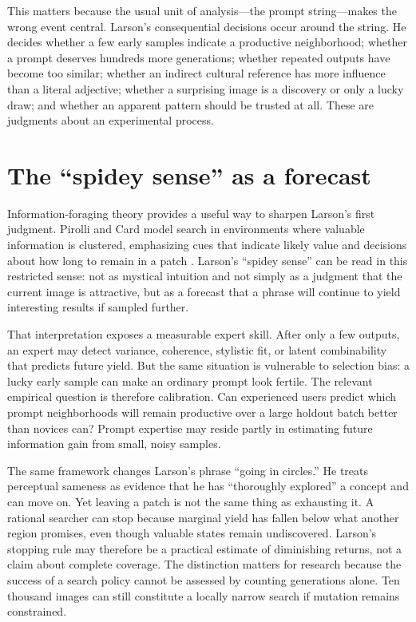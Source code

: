 \documentclass[11pt]{article}
\begin{document}
This matters because the usual unit of analysis—the prompt string—makes the wrong event central. Larson’s consequential decisions occur around the string. He decides whether a few early samples indicate a productive neighborhood; whether a prompt deserves hundreds more generations; whether repeated outputs have become too similar; whether an indirect cultural reference has more influence than a literal adjective; whether a surprising image is a discovery or only a lucky draw; and whether an apparent pattern should be trusted at all. These are judgments about an experimental process.

\section{The “spidey sense” as a forecast}
Information-foraging theory provides a useful way to sharpen Larson’s first judgment. Pirolli and Card model search in environments where valuable information is clustered, emphasizing cues that indicate likely value and decisions about how long to remain in a patch \cite{PirolliCard1999}. Larson’s ``spidey sense'' can be read in this restricted sense: not as mystical intuition and not simply as a judgment that the current image is attractive, but as a forecast that a phrase will continue to yield interesting results if sampled further.

That interpretation exposes a measurable expert skill. After only a few outputs, an expert may detect variance, coherence, stylistic fit, or latent combinability that predicts future yield. But the same situation is vulnerable to selection bias: a lucky early sample can make an ordinary prompt look fertile. The relevant empirical question is therefore calibration. Can experienced users predict which prompt neighborhoods will remain productive over a large holdout batch better than novices can? Prompt expertise may reside partly in estimating future information gain from small, noisy samples.

The same framework changes Larson’s phrase ``going in circles.'' He treats perceptual sameness as evidence that he has ``thoroughly explored'' a concept and can move on. Yet leaving a patch is not the same thing as exhausting it. A rational searcher can stop because marginal yield has fallen below what another region promises, even though valuable states remain undiscovered. Larson’s stopping rule may therefore be a practical estimate of diminishing returns, not a claim about complete coverage. The distinction matters for research because the success of a search policy cannot be assessed by counting generations alone. Ten thousand images can still constitute a locally narrow search if mutation remains constrained.
\end{document}
